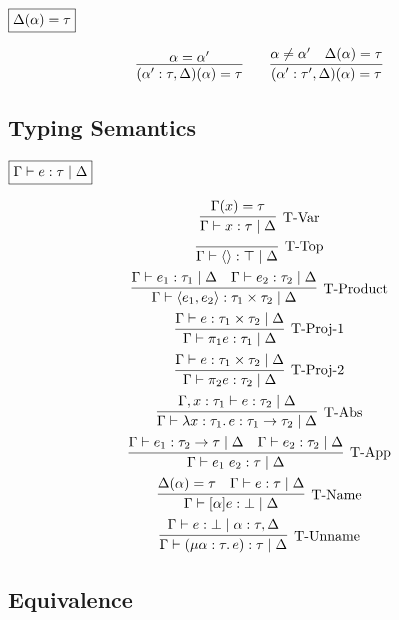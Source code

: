 $\fbox{$\Delta(\alpha) = \tau$}$

\begin{gather*}
  \infer{(\alpha': \tau, \Delta)(\alpha) = \tau}{
    \alpha = \alpha'
  }
  \hspace{2em}
  \infer{(\alpha': \tau', \Delta)(\alpha) = \tau}{
    \alpha \neq \alpha'
    &
    \Delta(\alpha) = \tau
  }
\end{gather*}

\subsection{Typing Semantics}

$\fbox{$\Gamma \vdash e: \tau \mid \Delta$}$

\begin{gather*}
  \infer[\text{T-Var}]{\Gamma \vdash x: \tau \mid \Delta}{
    \Gamma(x) = \tau
  }
  \\
  \infer[\text{T-Top}]{\Gamma \vdash \langle\rangle: \top \mid \Delta}{}
  \\
  \infer[\text{T-Product}]{\Gamma \vdash \langle e_1, e_2\rangle: \tau_1 \times \tau_2 \mid \Delta}{
    \Gamma \vdash e_1: \tau_1 \mid \Delta
    &
    \Gamma \vdash e_2: \tau_2 \mid \Delta
  }
  \\
  \infer[\text{T-Proj-1}]{\Gamma \vdash \pi_1 e: \tau_1 \mid \Delta}{
    \Gamma \vdash e: \tau_1 \times \tau_2 \mid \Delta
  }
  \\
  \infer[\text{T-Proj-2}]{\Gamma \vdash \pi_2 e: \tau_2 \mid \Delta}{
    \Gamma \vdash e: \tau_1 \times \tau_2 \mid \Delta
  }
  \\
  \infer[\text{T-Abs}]{\Gamma \vdash \lambda x: \tau_1\ldotp e: \tau_1 \to \tau_2 \mid \Delta}{
    \Gamma, x: \tau_1 \vdash e: \tau_2 \mid \Delta
  }
  \\
  \infer[\text{T-App}]{\Gamma \vdash e_1\; e_2: \tau \mid \Delta}{
    \Gamma \vdash e_1: \tau_2 \to \tau \mid \Delta
    &
    \Gamma \vdash e_2: \tau_2 \mid \Delta
  }
  \\
  \infer[\text{T-Name}]{\Gamma \vdash [\alpha] e: \bot \mid \Delta}{
    \Delta(\alpha) = \tau
    &
    \Gamma \vdash e: \tau \mid \Delta
  }
  \\
  \infer[\text{T-Unname}]{\Gamma \vdash (\mu \alpha: \tau\ldotp e): \tau \mid \Delta}{
    \Gamma \vdash e: \bot \mid \alpha: \tau, \Delta
  }
\end{gather*}

\subsection{Equivalence}

